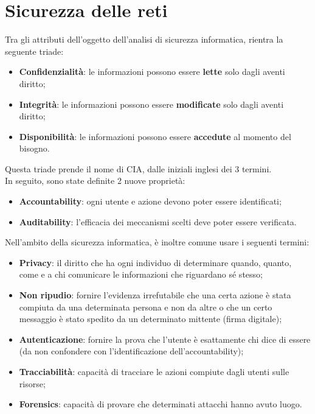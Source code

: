 \section{Sicurezza delle reti}

    Tra gli attributi dell’oggetto dell’analisi di sicurezza informatica, rientra la seguente triade:

    \begin{itemize}
        \item \textbf{Confidenzialità}: le informazioni possono essere \textbf{lette} solo dagli aventi diritto;
        \item \textbf{Integrità}: le informazioni possono essere \textbf{modificate} solo dagli aventi diritto;
        \item \textbf{Disponibilità}: le informazioni possono essere \textbf{accedute} al momento del bisogno.
    \end{itemize}

    Questa triade prende il nome di CIA, dalle iniziali inglesi dei 3 termini.\\
    In seguito, sono state definite 2 nuove proprietà:

    \begin{itemize}
        \item \textbf{Accountability}: ogni utente e azione devono poter essere identificati;
        \item \textbf{Auditability}: l’efficacia dei meccanismi scelti deve poter essere verificata.
    \end{itemize}

    Nell’ambito della sicurezza informatica, è inoltre comune usare i seguenti termini:

    \begin{itemize}
        \item \textbf{Privacy}: il diritto che ha ogni individuo di determinare quando, quanto, come e a chi
        comunicare le informazioni che riguardano sé stesso;
        \item \textbf{Non ripudio}: fornire l’evidenza irrefutabile che una certa azione è stata compiuta da 
        una determinata persona e non da altre o che un certo messaggio è stato spedito da un
        determinato mittente (firma digitale);
        \item \textbf{Autenticazione}: fornire la prova che l’utente è esattamente chi dice di essere (da non
        confondere con l’identificazione dell’accountability);
        \item \textbf{Tracciabilità}: capacità di tracciare le azioni compiute dagli utenti sulle risorse;
        \item \textbf{Forensics}: capacità di provare che determinati attacchi hanno avuto luogo.
    \end{itemize}

